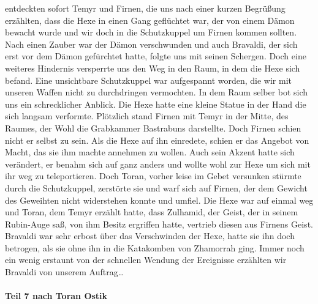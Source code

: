 entdeckten sofort Temyr und Firnen, die uns nach einer kurzen Begrüßung erzählten, dass die Hexe in einen Gang geflüchtet war, der von einem Dämon bewacht wurde und wir doch in die Schutzkuppel um Firnen kommen sollten. Nach einen Zauber war der Dämon verschwunden und auch Bravaldi, der sich erst vor dem Dämon gefürchtet hatte, folgte uns mit seinen Schergen. Doch eine weiteres Hindernis versperrte uns den Weg in den Raum, in dem die Hexe sich befand. Eine unsichtbare Schutzkuppel war aufgespannt worden, die wir mit unseren Waffen nicht zu durchdringen vermochten. In dem Raum selber bot sich uns ein schrecklicher Anblick. Die Hexe hatte eine kleine Statue in der Hand die sich langsam verformte. Plötzlich stand Firnen mit Temyr in der Mitte, des Raumes, der Wohl die Grabkammer Bastrabuns darstellte. Doch Firnen schien nicht er selbst zu sein. Als die Hexe auf ihn einredete, schien er das Angebot von Macht, das sie ihm machte annehmen zu wollen. Auch sein Akzent hatte sich verändert, er benahm sich auf ganz anders und wollte wohl zur Hexe um sich mit ihr weg zu teleportieren. Doch Toran, vorher leise im Gebet versunken stürmte durch die Schutzkuppel, zerstörte sie und warf sich auf Firnen, der dem Gewicht des Geweihten nicht widerstehen konnte und umfiel. Die Hexe war auf einmal weg und Toran, dem Temyr erzählt hatte, dass Zulhamid, der Geist, der in seinem Rubin-Auge saß, von ihm Besitz ergriffen hatte, vertrieb diesen aus Firnens Geist. Bravaldi war sehr erbost über das Verschwinden der Hexe, hatte sie ihn doch betrogen, als sie ohne ihn in die Katakomben von Zhamorrah ging. Immer noch ein wenig erstaunt von der schnellen Wendung der Ereignisse erzählten wir Bravaldi von unserem Auftrag\dots

\paragraph{Teil 7 nach Toran Ostik}

